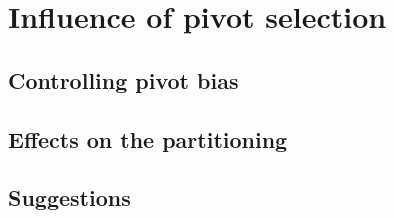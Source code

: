 \section{Influence of pivot selection}
\subsection{Controlling pivot bias}
\subsection{Effects on the partitioning}
\subsection{Suggestions}
